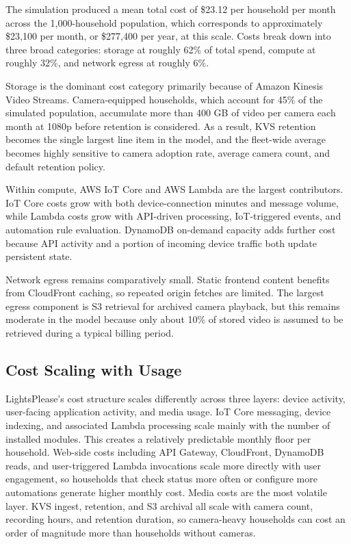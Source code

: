 The simulation produced a mean total cost of \$23.12 per household per month across the 1,000-household population, which corresponds to approximately \$23,100 per month, or \$277,400 per year, at this scale. Costs break down into three broad categories: storage at roughly 62\% of total spend, compute at roughly 32\%, and network egress at roughly 6\%.

Storage is the dominant cost category primarily because of Amazon Kinesis Video Streams. Camera-equipped households, which account for 45\% of the simulated population, accumulate more than 400 GB of video per camera each month at 1080p before retention is considered. As a result, KVS retention becomes the single largest line item in the model, and the fleet-wide average becomes highly sensitive to camera adoption rate, average camera count, and default retention policy.

Within compute, AWS IoT Core and AWS Lambda are the largest contributors. IoT Core costs grow with both device-connection minutes and message volume, while Lambda costs grow with API-driven processing, IoT-triggered events, and automation rule evaluation. DynamoDB on-demand capacity adds further cost because API activity and a portion of incoming device traffic both update persistent state.

Network egress remains comparatively small. Static frontend content benefits from CloudFront caching, so repeated origin fetches are limited. The largest egress component is S3 retrieval for archived camera playback, but this remains moderate in the model because only about 10\% of stored video is assumed to be retrieved during a typical billing period.

\subsection{Cost Scaling with Usage}

LightsPlease's cost structure scales differently across three layers: device activity, user-facing application activity, and media usage. IoT Core messaging, device indexing, and associated Lambda processing scale mainly with the number of installed modules. This creates a relatively predictable monthly floor per household. Web-side costs including API Gateway, CloudFront, DynamoDB reads, and user-triggered Lambda invocations scale more directly with user engagement, so households that check status more often or configure more automations generate higher monthly cost. Media costs are the most volatile layer. KVS ingest, retention, and S3 archival all scale with camera count, recording hours, and retention duration, so camera-heavy households can cost an order of magnitude more than households without cameras.

